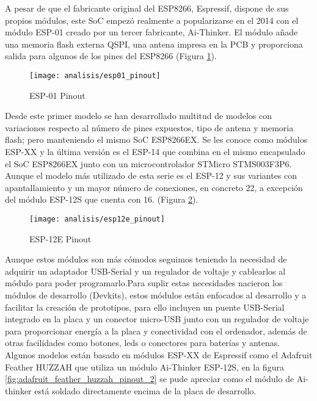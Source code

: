 \documentclass[../proyecto.tex]{subfiles}
\begin{document}
A pesar de que el fabricante original del ESP8266, Espressif, dispone de sus propios módulos, este SoC empezó realmente a popularizarse en el 2014 con el módulo ESP-01 creado por un tercer fabricante, Ai-Thinker. El módulo añade una memoria flash externa QSPI, una antena impresa en la PCB y proporciona salida para algunos de los pines del ESP8266 (Figura \ref{fig:esp01_pinout}).\\

\begin{figure}[H]
\centering
\texttt{[image: analisis/esp01\_pinout]}
\caption{ESP-01 Pinout}
\label{fig:esp01_pinout}
\end{figure}

Desde este primer modelo se han desarrollado multitud de modelos con variaciones respecto al número de pines expuestos, tipo de antena y memoria flash; pero manteniendo el mismo SoC ESP8266EX. Se les conoce como módulos ESP-XX y la última versión es el ESP-14 que combina en el mismo encapsulado el SoC ESP8266EX junto con un microcontrolador STMicro STMS003F3P6. Aunque el modelo más utilizado de esta serie es el ESP-12 y sus variantes con apantallamiento y un mayor número de conexiones, en concreto 22, a excepción del módulo ESP-12S que cuenta con 16. (Figura \ref{fig:esp12e_pinout}).\\

\begin{figure}[H]
\centering
\texttt{[image: analisis/esp12e\_pinout]}
\caption{ESP-12E Pinout}
\label{fig:esp12e_pinout}
\end{figure}

Aunque estos módulos son más cómodos seguimos teniendo la necesidad de adquirir un adaptador USB-Serial y un regulador de voltaje y cablearlos al módulo para poder programarlo.Para suplir estas necesidades nacieron los módulos de desarrollo (Devkits), estos módulos están enfocados al desarrollo y a facilitar la creación de prototipos, para ello incluyen un puente USB-Serial integrado en la placa y un conector micro-USB junto con un regulador de voltaje para proporcionar energía a la placa y conectividad con el ordenador, además de otras facilidades como botones, leds o conectores para baterías y antenas.\\

Algunos modelos están basado en módulos ESP-XX de Espressif como el Adafruit Feather HUZZAH \cite{adafruit_feather_huzzah} que utiliza un módulo Ai-Thinker ESP-12S, en la figura \ref{fig:adafruit_feather_huzzah_pinout_2} se pude apreciar como el módulo de Ai-thinker está soldado directamente encima de la placa de desarrollo.\\~\\
\end{document}
